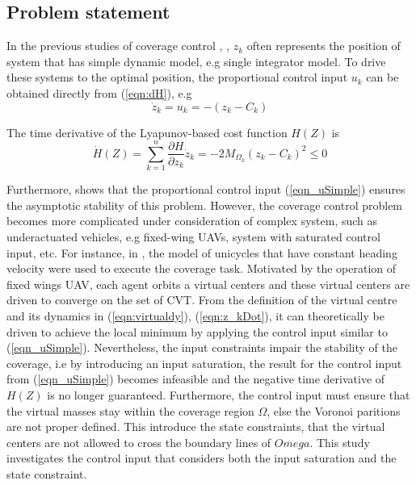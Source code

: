 \documentclass[journal]{IEEEtran}
\begin{document}
	{
	\color{red}
	\subsection{Problem statement}
	In the previous studies of coverage control \cite{} , \cite{} \cite{}, $z_k$ often represents the position of system that has simple dynamic model, e.g single integrator model. To drive these systems to the optimal position, the proportional control input $u_k$ can be obtained directly from (\ref{eqn:dH}), e.g 
	\begin{equation} \label{eqn_uSimple}
        \dot z_k = u_k = - (z_k - C_k)	
    \end{equation}
	
	The time derivative of the Lyapunov-based cost function $H(Z)$ is
	\[\dot H(Z) = \sum_{k = 1}^{n} \frac{\partial H}{\partial z_k} \dot z_k =  -2M_{\Omega_k}(z_k - C_k)^2 \leq 0\]
    
    Furthermore, \cite{Schwager} shows that the proportional control input (\ref{eqn_uSimple}) ensures the asymptotic stability of this problem. However, the coverage control problem becomes more complicated under consideration of complex system, such as underactuated vehicles, e.g fixed-wing UAVs, system with saturated control input, etc.  
    For instance, in \cite{Qingchen}, the model of unicycles that have constant heading velocity were used to execute the coverage task. Motivated by the operation of fixed wings UAV, each agent orbits a virtual centers and these virtual centers are driven to converge on the set of CVT. From the definition of the virtual centre and its dynamics in (\ref{eqn:virtualdy}), (\ref{eqn:z_kDot}), it can theoretically be driven to achieve the local minimum by applying the control input similar to (\ref{eqn_uSimple}). Nevertheless, the input constraints impair the stability of the coverage, i.e by introducing an input saturation, the result for the control input from (\ref{eqn_uSimple}) becomes infeasible and the negative time derivative of $H(Z)$ is no longer guaranteed. Furthermore, the control input must ensure that the virtual masses stay within the coverage region $\Omega$, else the Voronoi paritions are not proper defined. This introduce the state constraints, that the virtual centers are not allowed to cross the boundary lines of $Omega$. This study investigates the control input that considers both the input saturation and the state constraint.
    
}
\end{document}
